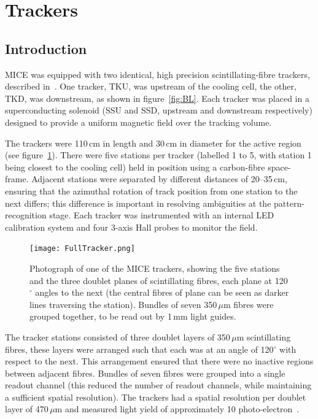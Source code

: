 \graphicspath{{06-Tracker/Figures/}}

\section{Trackers}
\label{Sect:Tracker}

\subsection{Introduction}
MICE was equipped with two identical, high precision scintillating-fibre trackers, described in~\cite{Ellis:2010bb}. One tracker, TKU, was upstream of the cooling cell, the other, TKD, was downstream, as shown in figure~\ref{fig:BL}.
Each tracker was placed in a superconducting solenoid (SSU and SSD, upstream and downstream respectively) designed to provide a uniform magnetic field over the tracking volume. 


The trackers were 110\,cm in length and 30\,cm in diameter for the active region (see figure~\ref{Figure:FullTracker}). There were five stations per tracker (labelled 1 to 5, with station 1 being closest to the cooling cell) held in position using a carbon-fibre space-frame.
Adjacent stations were separated by different distances of 20--35\,cm, ensuring that the azimuthal rotation of track position from one station to the next differs;
this difference is important in resolving ambiguities at the pattern-recognition stage. Each tracker was instrumented with an internal LED calibration system and four 3-axis Hall probes to monitor the field.

\begin{figure}[ht]
\begin{center}
\texttt{[image: FullTracker.png]}
\end{center}
\caption{Photograph of one of the MICE trackers, showing the five stations and the three doublet planes of scintillating fibres, each plane at 120$^\circ$ angles to the next (the central fibres of plane can be seen as darker lines traversing the station). Bundles of seven 350\,$\mu$m fibres were grouped together, to be read out by 1\,mm light guides.}
\label{Figure:FullTracker}
\end{figure}

The tracker stations consisted of three doublet layers of 350\,$\mu$m scintillating fibres, these layers were arranged such that each was at an angle of 120$^\circ$ with respect to the next. This arrangement ensured that there were no inactive regions between adjacent fibres. Bundles of seven fibres were grouped into a single readout channel (this reduced the number of readout channels, while maintaining a sufficient spatial resolution). The trackers had a spatial resolution per doublet layer of 470\,$\mu$m and measured light yield of approximately 10 photo-electron~\cite{Ellis:2010bb}.

